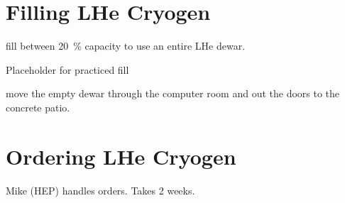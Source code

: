\section{Filling LHe Cryogen}
\label{sec:op_maintenance:filling_lhe}
\begin{pleasedo} fill between 20~\% capacity to use an entire LHe dewar. \end{pleasedo}
\FIXME Placeholder for practiced fill\\
\begin{pleasedo} move the empty dewar through the computer room and out the doors to the concrete patio. \end{pleasedo}

\section{Ordering LHe Cryogen}
\label{sec:op_maintenance:ordering_lhe}

Mike (HEP) handles orders.  Takes 2 weeks.

